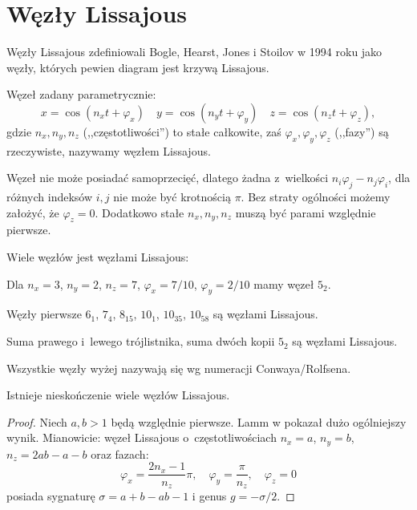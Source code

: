 \section{Węzły Lissajous} %
\label{sec:lissajous}

Węzły Lissajous zdefiniowali Bogle, Hearst, Jones i Stoilov w 1994 roku jako węzły, których pewien diagram jest krzywą Lissajous.

\begin{definition}
    Węzeł zadany parametrycznie:
    \begin{equation}
        x = \cos(n_xt + \varphi_x) \quad
        y = \cos(n_yt + \varphi_y) \quad
        z = \cos(n_zt + \varphi_z),
    \end{equation}
    gdzie $n_x, n_y, n_z$ (,,częstotliwości'') to stałe całkowite, zaś $\varphi_x, \varphi_y, \varphi_z$ (,,fazy'') są rzeczywiste, nazywamy węzłem Lissajous.
\end{definition}

Węzeł nie może posiadać samoprzecięć, dlatego żadna z~wielkości $n_i\varphi_j-n_j\varphi_i$, dla różnych indeksów $i, j$ nie może być krotnością $\pi$.
Bez straty ogólności możemy założyć, że $\varphi_z = 0$.
Dodatkowo stałe $n_x, n_y, n_z$ muszą być parami względnie pierwsze.

Wiele węzłów jest węzłami Lissajous:

\begin{example}
    Dla $n_x = 3$, $n_y = 2$, $n_z = 7$, $\varphi_x = 7/10$, $\varphi_y = 2/10$ mamy węzeł $5_2$.
\end{example}

\begin{example}
    Węzły pierwsze $6_1$, $7_4$, $8_{15}$, $10_1$, $10_{35}$, $10_{58}$ są węzłami Lissajous.
\end{example}

\begin{example}
    Suma prawego i~lewego trójlistnika, suma dwóch kopii $5_2$ są węzłami Lissajous.
\end{example}

Wszystkie węzły wyżej nazywają się wg numeracji Conwaya/Rolfsena.

\begin{proposition}
    Istnieje nieskończenie wiele węzłów Lissajous.
\end{proposition}

\begin{proof}
	Niech $a, b > 1$ będą względnie pierwsze.
	Lamm w \cite{lamm97} pokazał dużo ogólniejszy wynik.
	Mianowicie: węzeł Lissajous o~częstotliwościach $n_x = a$, $n_y = b$, $n_z = 2ab-a-b$ oraz fazach:
    \begin{equation}
        \varphi_x = \frac{2n_x-1}{n_z} \pi, \quad
        \varphi_y = \frac{\pi}{n_z}, \quad
        \varphi_z = 0
    \end{equation}
    posiada sygnaturę $\sigma = a+b-ab-1$ i genus $g = -\sigma/2$.
\end{proof}

